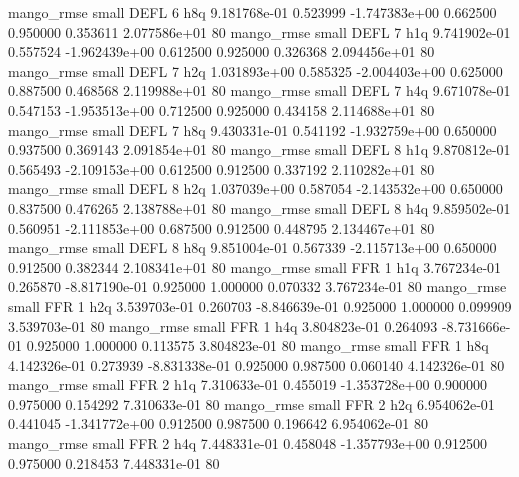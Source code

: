        mango_rmse      small     DEFL                 6                  h8q 9.181768e-01      0.523999 -1.747383e+00 0.662500 0.950000       0.353611 2.077586e+01 80
       mango_rmse      small     DEFL                 7                  h1q 9.741902e-01      0.557524 -1.962439e+00 0.612500 0.925000       0.326368 2.094456e+01 80
       mango_rmse      small     DEFL                 7                  h2q 1.031893e+00      0.585325 -2.004403e+00 0.625000 0.887500       0.468568 2.119988e+01 80
       mango_rmse      small     DEFL                 7                  h4q 9.671078e-01      0.547153 -1.953513e+00 0.712500 0.925000       0.434158 2.114688e+01 80
       mango_rmse      small     DEFL                 7                  h8q 9.430331e-01      0.541192 -1.932759e+00 0.650000 0.937500       0.369143 2.091854e+01 80
       mango_rmse      small     DEFL                 8                  h1q 9.870812e-01      0.565493 -2.109153e+00 0.612500 0.912500       0.337192 2.110282e+01 80
       mango_rmse      small     DEFL                 8                  h2q 1.037039e+00      0.587054 -2.143532e+00 0.650000 0.837500       0.476265 2.138788e+01 80
       mango_rmse      small     DEFL                 8                  h4q 9.859502e-01      0.560951 -2.111853e+00 0.687500 0.912500       0.448795 2.134467e+01 80
       mango_rmse      small     DEFL                 8                  h8q 9.851004e-01      0.567339 -2.115713e+00 0.650000 0.912500       0.382344 2.108341e+01 80
       mango_rmse      small      FFR                 1                  h1q 3.767234e-01      0.265870 -8.817190e-01 0.925000 1.000000       0.070332 3.767234e-01 80
       mango_rmse      small      FFR                 1                  h2q 3.539703e-01      0.260703 -8.846639e-01 0.925000 1.000000       0.099909 3.539703e-01 80
       mango_rmse      small      FFR                 1                  h4q 3.804823e-01      0.264093 -8.731666e-01 0.925000 1.000000       0.113575 3.804823e-01 80
       mango_rmse      small      FFR                 1                  h8q 4.142326e-01      0.273939 -8.831338e-01 0.925000 0.987500       0.060140 4.142326e-01 80
       mango_rmse      small      FFR                 2                  h1q 7.310633e-01      0.455019 -1.353728e+00 0.900000 0.975000       0.154292 7.310633e-01 80
       mango_rmse      small      FFR                 2                  h2q 6.954062e-01      0.441045 -1.341772e+00 0.912500 0.987500       0.196642 6.954062e-01 80
       mango_rmse      small      FFR                 2                  h4q 7.448331e-01      0.458048 -1.357793e+00 0.912500 0.975000       0.218453 7.448331e-01 80
